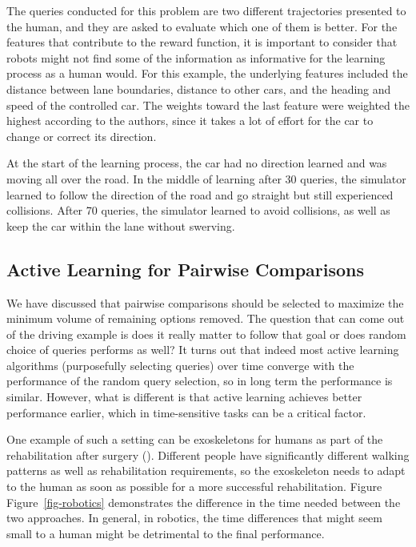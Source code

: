 \documentclass[
  letterpaper,
  numbers=noenddot,
  DIV=11,
  oneside]{scrreprt}
\theoremstyle{remark}
\begin{document}
The queries conducted for this problem are two different trajectories
presented to the human, and they are asked to evaluate which one of them
is better. For the features that contribute to the reward function, it
is important to consider that robots might not find some of the
information as informative for the learning process as a human would.
For this example, the underlying features included the distance between
lane boundaries, distance to other cars, and the heading and speed of
the controlled car. The weights toward the last feature were weighted
the highest according to the authors, since it takes a lot of effort for
the car to change or correct its direction.

At the start of the learning process, the car had no direction learned
and was moving all over the road. In the middle of learning after 30
queries, the simulator learned to follow the direction of the road and
go straight but still experienced collisions. After 70 queries, the
simulator learned to avoid collisions, as well as keep the car within
the lane without swerving.

\subsection{Active Learning for Pairwise
Comparisons}\label{active-learning-for-pairwise-comparisons}

We have discussed that pairwise comparisons should be selected to
maximize the minimum volume of remaining options removed. The question
that can come out of the driving example is does it really matter to
follow that goal or does random choice of queries performs as well? It
turns out that indeed most active learning algorithms (purposefully
selecting queries) over time converge with the performance of the random
query selection, so in long term the performance is similar. However,
what is different is that active learning achieves better performance
earlier, which in time-sensitive tasks can be a critical factor.

One example of such a setting can be exoskeletons for humans as part of
the rehabilitation after surgery (). Different people have significantly different walking patterns
as well as rehabilitation requirements, so the exoskeleton needs to
adapt to the human as soon as possible for a more successful
rehabilitation. Figure Figure~\ref{fig-robotics} demonstrates the
difference in the time needed between the two approaches. In general, in
robotics, the time differences that might seem small to a human might be
detrimental to the final performance.
\end{document}
